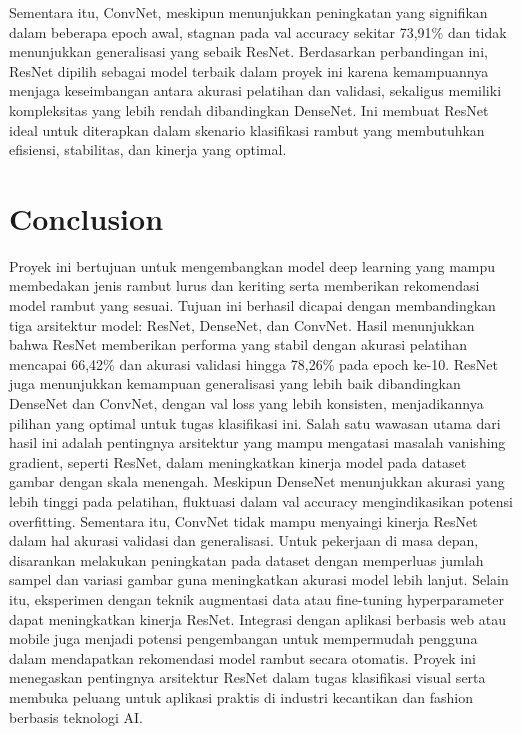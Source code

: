 \documentclass[12pt,a4paper]{article}
\begin{document}
Sementara itu, ConvNet, meskipun menunjukkan peningkatan yang signifikan dalam beberapa epoch awal, stagnan pada val accuracy sekitar 73,91\% dan tidak menunjukkan generalisasi yang sebaik ResNet. Berdasarkan perbandingan ini, ResNet dipilih sebagai model terbaik dalam proyek ini karena kemampuannya menjaga keseimbangan antara akurasi pelatihan dan validasi, sekaligus memiliki kompleksitas yang lebih rendah dibandingkan DenseNet. Ini membuat ResNet ideal untuk diterapkan dalam skenario klasifikasi rambut yang membutuhkan efisiensi, stabilitas, dan kinerja yang optimal.



\section{Conclusion}
Proyek ini bertujuan untuk mengembangkan model deep learning yang mampu membedakan jenis rambut lurus dan keriting serta memberikan rekomendasi model rambut yang sesuai. Tujuan ini berhasil dicapai dengan membandingkan tiga arsitektur model: ResNet, DenseNet, dan ConvNet. Hasil menunjukkan bahwa ResNet memberikan performa yang stabil dengan akurasi pelatihan mencapai 66,42\% dan akurasi validasi hingga 78,26\% pada epoch ke-10. ResNet juga menunjukkan kemampuan generalisasi yang lebih baik dibandingkan DenseNet dan ConvNet, dengan val loss yang lebih konsisten, menjadikannya pilihan yang optimal untuk tugas klasifikasi ini. Salah satu wawasan utama dari hasil ini adalah pentingnya arsitektur yang mampu mengatasi masalah vanishing gradient, seperti ResNet, dalam meningkatkan kinerja model pada dataset gambar dengan skala menengah. Meskipun DenseNet menunjukkan akurasi yang lebih tinggi pada pelatihan, fluktuasi dalam val accuracy mengindikasikan potensi overfitting. Sementara itu, ConvNet tidak mampu menyaingi kinerja ResNet dalam hal akurasi validasi dan generalisasi. Untuk pekerjaan di masa depan, disarankan melakukan peningkatan pada dataset dengan memperluas jumlah sampel dan variasi gambar guna meningkatkan akurasi model lebih lanjut. Selain itu, eksperimen dengan teknik augmentasi data atau fine-tuning hyperparameter dapat meningkatkan kinerja ResNet. Integrasi dengan aplikasi berbasis web atau mobile juga menjadi potensi pengembangan untuk mempermudah pengguna dalam mendapatkan rekomendasi model rambut secara otomatis. Proyek ini menegaskan pentingnya arsitektur ResNet dalam tugas klasifikasi visual serta membuka peluang untuk aplikasi praktis di industri kecantikan dan fashion berbasis teknologi AI.
\end{document}
